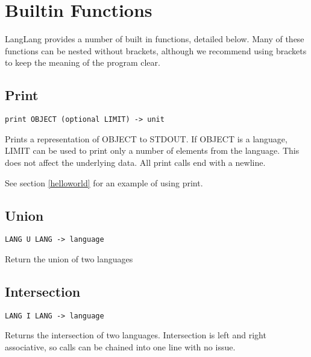 \section{Builtin Functions}
\label{builtins}
\begin{normalsize}
LangLang provides a number of built in functions, detailed below. Many of these functions can be nested without brackets, although we recommend using brackets to keep the meaning of the program clear.
\end{normalsize}

\subsection{Print}
\label{print}
\begin{center}
\begin{minipage}{8cm}
\begin{verbatim}
print OBJECT (optional LIMIT) -> unit
\end{verbatim}
\end{minipage}
\end{center}
\begin{normalsize}
Prints a representation of OBJECT to STDOUT. If OBJECT is a language, LIMIT can be used to print only a number of elements from the language. This does not affect the underlying data. All print calls end with a newline.

See section \ref{helloworld} for an example of using print.
\end{normalsize}

\subsection{Union}
\begin{center}
\begin{minipage}{5cm}
\begin{verbatim}
LANG U LANG -> language
\end{verbatim}
\end{minipage}
\end{center}
\begin{normalsize}
Return the union of two languages
\end{normalsize}

\subsection{Intersection}
\begin{center}
\begin{minipage}{5cm}
\begin{verbatim}
LANG I LANG -> language
\end{verbatim}
\end{minipage}
\end{center}
\begin{normalsize}
Returns the intersection of two languages. Intersection is left and right associative, so calls can be chained into one line with no issue.
\end{normalsize}

